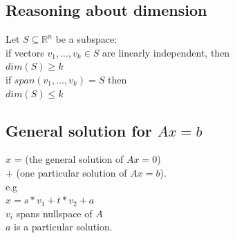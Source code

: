 \begin{multicols}{3}
\subsection{Reasoning about dimension}
Let $S \subseteq \mathbb{R}^{n}$ be a subspace:\\
\quad if vectors $v_{1}, \dots, v_{k} \in S$ are linearly independent, then\\
\quad \quad $dim(S) \geq k$\\
\quad if $span({v_{1}, \dots, v_{k}}) = S$ then\\
\quad \quad $dim(S) \leq k$

\subsection{General solution for $Ax = b$}
$x$ = (the general solution of $Ax = 0$)\\
\quad $+$ (one particular solution of $Ax = b$).\\
e.g\\
$x = s*v_{1} + t*v_{2} + a$\\ $v_{i}$ spans nullspace of $A$\\$a$ is a particular solution.
\end{multicols}
